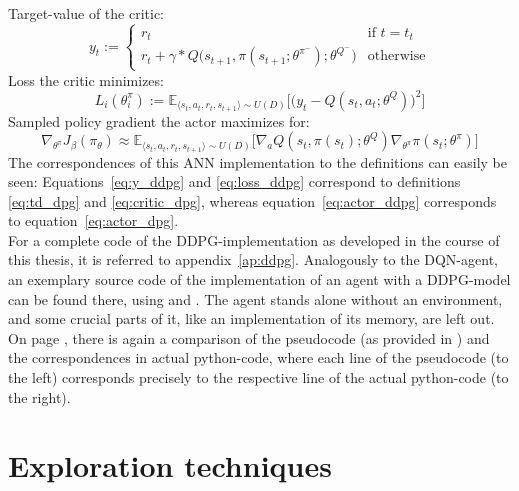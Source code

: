 \noindent Target-value of the critic:
\begin{equation} \label{eq:y_ddpg}
	y_t := \begin{cases} 
	r_t & \text{if } t = t_t\\
	r_t + \gamma * Q\big(s_{t+1}, \pi(s_{t+1};\theta^{\pi^-});\theta^{Q^-} \big)  & \text{otherwise} 
	\end{cases} %
\end{equation}
\noindent Loss the critic minimizes:
\begin{equation} \label{eq:loss_ddpg}
	L_i(\theta^\pi_i) := \mathds{E}_{\langle s_t,a_t,r_t,s_{t+1} \rangle \sim U(D)} \Big[\Big( y_t - Q(s_t,a_t;\theta^Q) \Big)^2\Big]
\end{equation}
\noindent Sampled policy gradient the actor maximizes for:
\begin{equation} \label{eq:actor_ddpg}
	\nabla_{\theta^\pi}J_\beta(\pi_\theta) \approx \mathds{E}_{\langle s_t,a_t,r_t,s_{t+1} \rangle \sim U(D)} \Big[ \nabla_a Q(s_t,\pi(s_t);\theta^Q) \nabla_{\theta^\pi} \pi(s_t;\theta^\pi) \Big]
\end{equation}
The correspondences of this ANN implementation to the definitions can easily be seen: Equations~\ref{eq:y_ddpg} and \ref{eq:loss_ddpg} correspond to definitions \ref{eq:td_dpg} and \ref{eq:critic_dpg}, whereas equation~\ref{eq:actor_ddpg} corresponds to equation~\ref{eq:actor_dpg}.\\

For a complete code of the DDPG-implementation as developed in the course of this thesis, it is referred to appendix~\ref{ap:ddpg}. Analogously to the DQN-agent, an exemplary source code of the implementation of an agent with a DDPG-model can be found there, using  and . The agent stands alone without an environment, and some crucial parts of it, like an implementation of its memory, are left out. On page \pageref{ap:ddpg_comparison}, there is again a comparison of the pseudocode (as provided in \cite{lillicrap_continuous_2015}) and the correspondences in actual python-code, where each line of the pseudocode (to the left) corresponds precisely to the respective line of the actual python-code (to the right).



\section{Exploration techniques}

